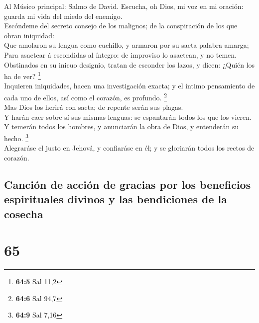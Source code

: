  Al Músico principal: Salmo de David. Escucha, oh Dios, mi
voz en mi oración: guarda mi vida del miedo del enemigo.\\
 Escóndeme del secreto consejo de los malignos; de la
conspiración de los que obran iniquidad:\\
 Que amolaron su lengua como cuchillo, y armaron por su
saeta palabra amarga;\\
 Para asaetear á escondidas al íntegro: de improviso lo
asaetean, y no temen.\\
 Obstinados en su inicuo designio, tratan de esconder los
lazos, y dicen: ¿Quién los ha de ver? \footnote{\textbf{64:5} Sal 11,2}\\
 Inquieren iniquidades, hacen una investigación exacta; y
el íntimo pensamiento de cada uno de ellos, así como el corazón, es
profundo. \footnote{\textbf{64:6} Sal 94,7}\\
 Mas Dios los herirá con saeta; de repente serán sus
plagas.\\
 Y harán caer sobre sí sus mismas lenguas: se espantarán
todos los que los vieren.\\
 Y temerán todos los hombres, y anunciarán la obra de
Dios, y entenderán su hecho. \footnote{\textbf{64:9} Sal 7,16}\\
 Alegraráse el justo en Jehová, y confiaráse en él; y se
gloriarán todos los rectos de corazón.

\hypertarget{canciuxf3n-de-acciuxf3n-de-gracias-por-los-beneficios-espirituales-divinos-y-las-bendiciones-de-la-cosecha}{%
\subsection{Canción de acción de gracias por los beneficios espirituales
divinos y las bendiciones de la
cosecha}\label{canciuxf3n-de-acciuxf3n-de-gracias-por-los-beneficios-espirituales-divinos-y-las-bendiciones-de-la-cosecha}}

\hypertarget{section-64}{%
\section{65}\label{section-64}}

